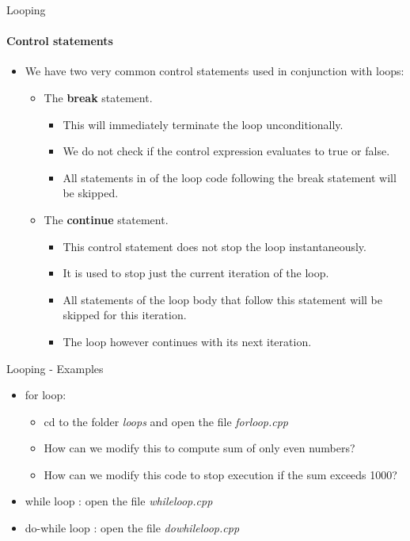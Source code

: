 \documentclass[aspectratio=169]{beamer}
\begin{document}
\begin{frame}[fragile]{Looping}
	\framesubtitle{Control statements}
	\begin{itemize}
		\item We have two very common control statements used in conjunction with loops:
		\begin{itemize}
			\item The \textbf{break} statement.
			\begin{itemize}
				\item This will immediately terminate the loop unconditionally.
				\item We do not check if the control expression evaluates to true or false. 
				\item All statements in of the loop code following the break statement will be skipped.
			\end{itemize}
			\item The \textbf{continue} statement.
			\begin{itemize}
				\item This control statement does not stop the loop instantaneously.
				\item It is used to stop just the current iteration of the loop.
				\item All statements of the loop body that follow this statement will be skipped for this iteration.
				\item The loop however continues with its next iteration.
			\end{itemize}
		\end{itemize}
	\end{itemize}
\end{frame}

\begin{frame}[fragile]{Looping - Examples}
	\begin{itemize}
		\item for loop:
		\begin{itemize}
			\item cd to the folder \textit{loops} and open the file \textit{forloop.cpp}
			\item How can we modify this to compute sum of only even numbers?
			\item How can we modify this code to stop execution if the sum exceeds 1000?
		\end{itemize}
		\item while loop : open the file \textit{whileloop.cpp}
		\item do-while loop : open the file \textit{dowhileloop.cpp}
	\end{itemize}
\end{frame}
\end{document}

